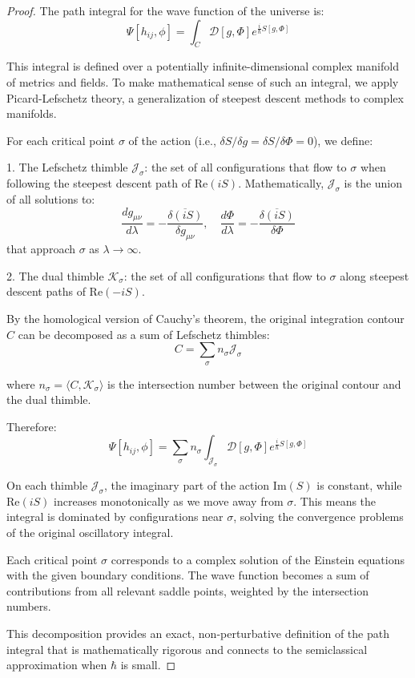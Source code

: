\documentclass{article}
\begin{document}
\begin{proof}
The path integral for the wave function of the universe is:
\begin{equation}
\Psi[h_{ij}, \phi] = \int_C \mathcal{D}[g, \Phi] e^{\frac{i}{\hbar}S[g,\Phi]}
\end{equation}

This integral is defined over a potentially infinite-dimensional complex manifold of metrics and fields. To make mathematical sense of such an integral, we apply Picard-Lefschetz theory, a generalization of steepest descent methods to complex manifolds.

For each critical point $\sigma$ of the action (i.e., $\delta S/\delta g = \delta S/\delta \Phi = 0$), we define:

1. The Lefschetz thimble $\mathcal{J}_\sigma$: the set of all configurations that flow to $\sigma$ when following the steepest descent path of $\text{Re}(iS)$. Mathematically, $\mathcal{J}_\sigma$ is the union of all solutions to:
\begin{equation}
\frac{dg_{\mu\nu}}{d\lambda} = -\overline{\frac{\delta (iS)}{\delta g_{\mu\nu}}}, \quad \frac{d\Phi}{d\lambda} = -\overline{\frac{\delta (iS)}{\delta \Phi}}
\end{equation}
that approach $\sigma$ as $\lambda \to \infty$.

2. The dual thimble $\mathcal{K}_\sigma$: the set of all configurations that flow to $\sigma$ along steepest descent paths of $\text{Re}(-iS)$.

By the homological version of Cauchy's theorem, the original integration contour $C$ can be decomposed as a sum of Lefschetz thimbles:
\begin{equation}
C = \sum_\sigma n_\sigma \mathcal{J}_\sigma
\end{equation}

where $n_\sigma = \langle C, \mathcal{K}_\sigma \rangle$ is the intersection number between the original contour and the dual thimble.

Therefore:
\begin{equation}
\Psi[h_{ij}, \phi] = \sum_\sigma n_\sigma \int_{\mathcal{J}_\sigma} \mathcal{D}[g, \Phi] e^{\frac{i}{\hbar}S[g,\Phi]}
\end{equation}

On each thimble $\mathcal{J}_\sigma$, the imaginary part of the action $\text{Im}(S)$ is constant, while $\text{Re}(iS)$ increases monotonically as we move away from $\sigma$. This means the integral is dominated by configurations near $\sigma$, solving the convergence problems of the original oscillatory integral.

Each critical point $\sigma$ corresponds to a complex solution of the Einstein equations with the given boundary conditions. The wave function becomes a sum of contributions from all relevant saddle points, weighted by the intersection numbers.

This decomposition provides an exact, non-perturbative definition of the path integral that is mathematically rigorous and connects to the semiclassical approximation when $\hbar$ is small.
\end{proof}
\end{document}

